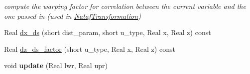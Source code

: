 \begin{DoxyCompactItemize}
\begin{DoxyCompactList}\small\item\em compute the warping factor for correlation between the current variable and the one passed in (used in \hyperlink{classPecos_1_1NatafTransformation}{Nataf\+Transformation}) \end{DoxyCompactList}\item 
Real \hyperlink{classPecos_1_1UniformRandomVariable_af889af8adfb262c9b74f573b2a9ffc99}{dx\+\_\+ds} (short dist\+\_\+param, short u\+\_\+type, Real x, Real z) const 
\item 
Real \hyperlink{classPecos_1_1UniformRandomVariable_af6b5fc528523180bed5fc3008dcea205}{dz\+\_\+ds\+\_\+factor} (short u\+\_\+type, Real x, Real z) const 
\item 
void {\bfseries update} (Real lwr, Real upr)\label{classPecos_1_1UniformRandomVariable_ac5e282327098a99801987718ea525804}

\end{DoxyCompactItemize}
